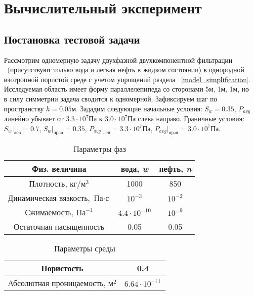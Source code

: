 \section{Вычислительный эксперимент}


\subsection{Постановка тестовой задачи}
\label{test_task}
Рассмотрим одномерную задачу двухфазной двухкомпонентной фильтрации ~(присутствуют только вода и легкая нефть в жидком состоянии)
в однородной изотропной пористой среде с учетом упрощений раздела ~\ref{model_simplification}.
Исследуемая область имеет форму параллелепипеда со сторонами 5м, 1м, 1м, но в силу симметрии задача сводится к одномерной.
Зафиксируем шаг по пространству $h=0.05\text{м}$.
Зададим следующие начальные условия: $S_w = 0.35$, $P_{avg}$ линейно убывает от $3.3\cdot 10^7$Па к $3.0\cdot 10^7$Па слева направо.
Граничные условия: $S_w|_{\text{лев}} = 0.7$, $S_w|_{\text{прав}} = 0.35$,
$P_{avg}|_{\text{лев}} = 3.3\cdot 10^7$Па, $P_{avg}|_{\text{прав}} = 3.0\cdot 10^7$Па.

\begin{table}[H]
\caption{Параметры фаз}
\label{tabular:liquids}
\begin{center}
\begin{tabular}{|c|c|c|}
\hline
Физ. величина & вода, \textit {w} & нефть, \textit {n} \\
\hline
Плотность,  $ {\text{кг}} / {\text{м}^3} $ & 1000 & 850 \\
\hline
Динамическая вязкость, $ \text{Па} \cdot \text{с} $ & $10^{-3}$ & $10^{-2}$ \\
\hline
Сжимаемость, $ \text{Па}^{-1}$ & $4.4 \cdot 10^{-10}$ & $10^{-9}$ \\
\hline
Остаточная насыщенность & 0.05 & 0.05 \\
\hline
\end{tabular}
\end{center}
\end{table}

\begin{table}[H]
\caption{Параметры среды}
\label{tabular:medium}
\begin{center}
\begin{tabular}{|c|c|}
\hline
Пористость & 0.4\\
\hline
Абсолютная проницаемость, $ \text{м}^{2}$ & $6.64 \cdot 10^{-11}$ \\
\hline
\end{tabular}
\end{center}
\end{table}


